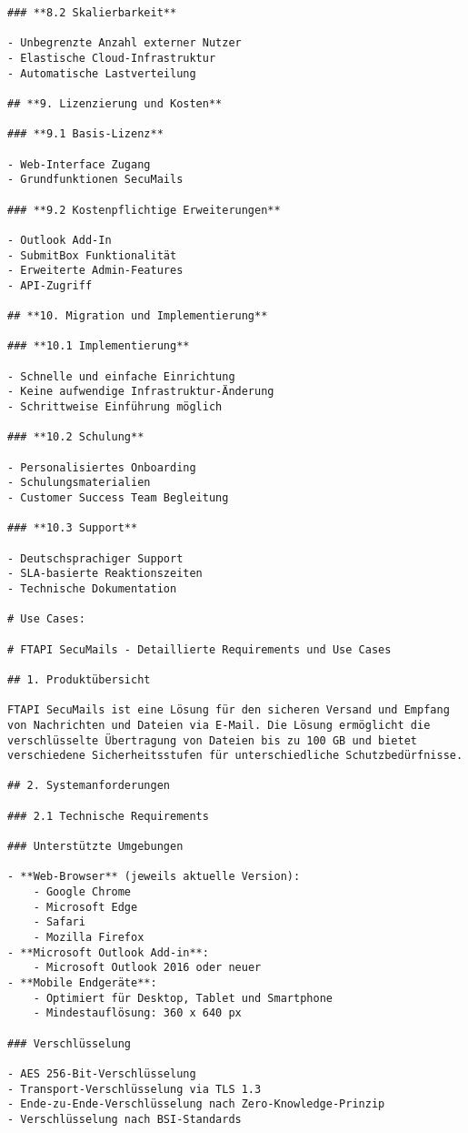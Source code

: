 \begin{verbatim}
### **8.2 Skalierbarkeit**

- Unbegrenzte Anzahl externer Nutzer
- Elastische Cloud-Infrastruktur
- Automatische Lastverteilung

## **9. Lizenzierung und Kosten**

### **9.1 Basis-Lizenz**

- Web-Interface Zugang
- Grundfunktionen SecuMails

### **9.2 Kostenpflichtige Erweiterungen**

- Outlook Add-In
- SubmitBox Funktionalität
- Erweiterte Admin-Features
- API-Zugriff

## **10. Migration und Implementierung**

### **10.1 Implementierung**

- Schnelle und einfache Einrichtung
- Keine aufwendige Infrastruktur-Änderung
- Schrittweise Einführung möglich

### **10.2 Schulung**

- Personalisiertes Onboarding
- Schulungsmaterialien
- Customer Success Team Begleitung

### **10.3 Support**

- Deutschsprachiger Support
- SLA-basierte Reaktionszeiten
- Technische Dokumentation

# Use Cases:

# FTAPI SecuMails - Detaillierte Requirements und Use Cases

## 1. Produktübersicht

FTAPI SecuMails ist eine Lösung für den sicheren Versand und Empfang von Nachrichten und Dateien via E-Mail. Die Lösung ermöglicht die verschlüsselte Übertragung von Dateien bis zu 100 GB und bietet verschiedene Sicherheitsstufen für unterschiedliche Schutzbedürfnisse.

## 2. Systemanforderungen

### 2.1 Technische Requirements

### Unterstützte Umgebungen

- **Web-Browser** (jeweils aktuelle Version):
    - Google Chrome
    - Microsoft Edge
    - Safari
    - Mozilla Firefox
- **Microsoft Outlook Add-in**:
    - Microsoft Outlook 2016 oder neuer
- **Mobile Endgeräte**:
    - Optimiert für Desktop, Tablet und Smartphone
    - Mindestauflösung: 360 x 640 px

### Verschlüsselung

- AES 256-Bit-Verschlüsselung
- Transport-Verschlüsselung via TLS 1.3
- Ende-zu-Ende-Verschlüsselung nach Zero-Knowledge-Prinzip
- Verschlüsselung nach BSI-Standards


\end{verbatim}
